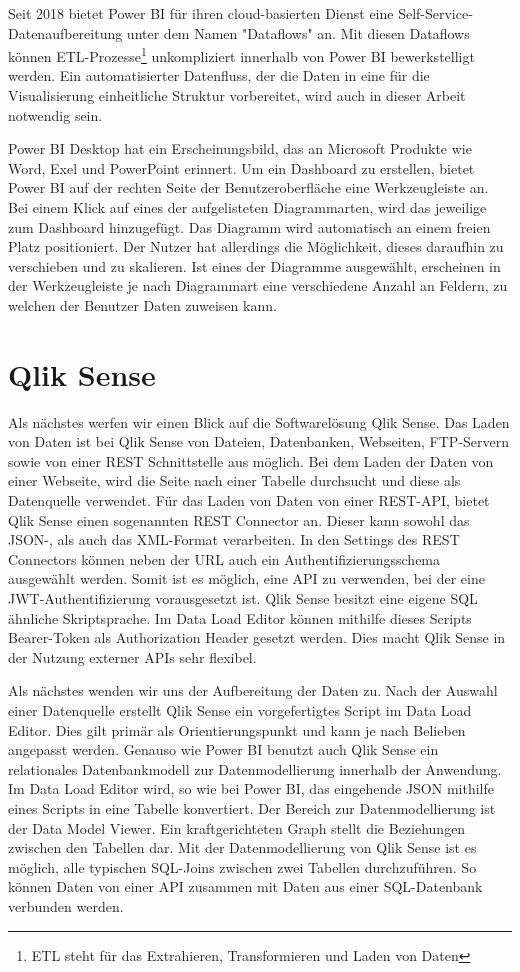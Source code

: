 Seit 2018 bietet Power BI für ihren cloud-basierten Dienst eine Self-Service-Datenaufbereitung unter dem Namen "Dataflows" an.\cite{MicrosoftDataflowsPreview}
Mit diesen Dataflows können ETL-Prozesse\footnote{ETL steht für das Extrahieren, Transformieren und Laden von Daten}
unkompliziert innerhalb von Power BI bewerkstelligt werden. Ein automatisierter Datenfluss,
der die Daten in eine für die Visualisierung einheitliche Struktur vorbereitet, wird auch in dieser
Arbeit notwendig sein.

Power BI Desktop hat ein Erscheinungsbild, das an Microsoft Produkte wie Word, Exel und
PowerPoint erinnert. Um ein Dashboard zu erstellen, bietet Power BI auf der rechten Seite
der Benutzeroberfläche eine Werkzeugleiste an. Bei einem Klick auf eines der aufgelisteten
Diagrammarten, wird das jeweilige zum Dashboard hinzugefügt. Das Diagramm wird 
automatisch an einem freien Platz positioniert. Der Nutzer hat allerdings die Möglichkeit,
dieses daraufhin zu verschieben und zu skalieren. Ist eines der Diagramme ausgewählt,
erscheinen in der Werkzeugleiste je nach Diagrammart eine verschiedene Anzahl an Feldern,
zu welchen der Benutzer Daten zuweisen kann.

\section{Qlik Sense}
\label{sec:qliksense}
Als nächstes werfen wir einen Blick auf die Softwarelösung Qlik Sense.
Das Laden von Daten ist bei Qlik Sense von Dateien, Datenbanken, Webseiten, FTP-Servern sowie von einer
REST Schnittstelle aus möglich. Bei dem Laden der Daten von einer Webseite, wird die Seite nach einer Tabelle
durchsucht und diese als Datenquelle verwendet.\cite[S. 17]{QlikSenseCookbook} Für das Laden von Daten von
einer REST-API, bietet Qlik Sense einen sogenannten REST Connector an. Dieser kann sowohl das \mbox{JSON-,} als auch
das XML-Format verarbeiten. In den Settings des REST Connectors können neben der URL auch ein
Authentifizierungsschema ausgewählt werden.\cite[S. 23]{QlikSenseCookbook} Somit ist es möglich,
eine API zu verwenden, bei der eine JWT-Authentifizierung vorausgesetzt ist. Qlik Sense besitzt
eine eigene SQL ähnliche Skriptsprache. Im Data Load Editor
können mithilfe dieses Scripts Bearer-Token als Authorization Header gesetzt werden. Dies macht Qlik
Sense in der Nutzung externer APIs sehr flexibel.

Als nächstes wenden wir uns der Aufbereitung der Daten zu. Nach der Auswahl einer Datenquelle
erstellt Qlik Sense ein vorgefertigtes Script im Data Load Editor. Dies gilt primär als Orientierungspunkt
und kann je nach Belieben angepasst werden. Genauso wie Power BI benutzt auch Qlik Sense ein relationales
Datenbankmodell zur Datenmodellierung innerhalb der Anwendung. Im Data Load Editor
wird, so wie bei Power BI, das eingehende JSON mithilfe eines Scripts in eine Tabelle konvertiert.
Der Bereich zur Datenmodellierung ist der Data Model Viewer. Ein kraftgerichteten Graph stellt die
Beziehungen zwischen den Tabellen dar. Mit der Datenmodellierung von Qlik Sense ist es möglich, alle typischen SQL-Joins
zwischen zwei Tabellen durchzuführen. So können Daten von einer API zusammen mit Daten aus einer SQL-Datenbank
verbunden werden.

